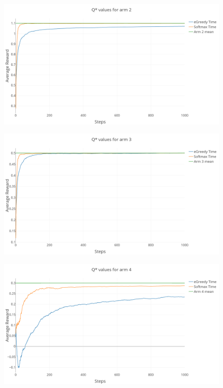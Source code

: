 \documentclass[a4paper, 11pt]{article}
\begin{document}
\begin{figure}[H]
	\centering
    \includegraphics[width=1\linewidth]{ex1_3_Q2}
\end{figure}

\begin{figure}[H]
	\centering
    \includegraphics[width=1\linewidth]{ex1_3_Q3}
\end{figure}

\begin{figure}[H]
	\centering
    \includegraphics[width=1\linewidth]{ex1_3_Q4}
\end{figure}
\end{document}
